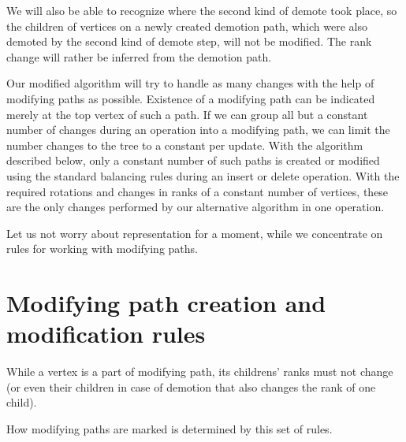We will also be able to recognize where the second kind of demote took place, so the children of vertices on a newly created demotion path, which were also demoted by the second kind of demote step, will not be modified. 
The rank change will rather be inferred from the demotion path. 

Our modified algorithm will try to handle as many changes with the help of modifying paths as possible. 
Existence of a modifying path can be indicated merely at the top vertex of such a path. 
If we can group all but a constant number of changes during an operation into a modifying path, we can limit the number changes to the tree to a constant per update. 
With the algorithm described below, only a constant number of such paths is created or modified using the standard balancing rules during an insert or delete operation. 
With the required rotations and changes in ranks of a constant number of vertices, these are the only changes performed by our alternative algorithm in one operation.

Let us not worry about representation for a moment, while we concentrate on rules for working with modifying paths.

\section{Modifying path creation and modification rules}

While a vertex is a part of modifying path, its childrens' ranks must not change (or even their children in case of demotion that also changes the rank of one child). 

How modifying paths are marked is determined by this set of rules.

